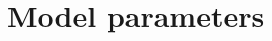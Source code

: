\documentclass[10pt,a4paper,twoside,american]{article}
\theoremstyle{definitionstyle}
\begin{document}
\section{Model parameters}
\label{sec:model_parameters}

\renewcommand{\arraystretch}{1.2}
\def\widthA{0.1}
\def\widthB{0.2}
\def\widthC{0.7}
\begin{table}[H]



\end{table}
\end{document}
